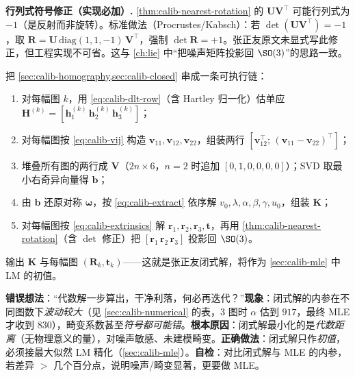 \begin{note}
\textbf{行列式符号修正（实现必加）.}\;
\cref{thm:calib-nearest-rotation} 的 $\mathbf{U}\mathbf{V}^\top$ 可能行列式为 $-1$（是反射而非旋转）。标准做法（Procrustes/Kabsch）：若 $\det(\mathbf{U}\mathbf{V}^\top)=-1$，取 $\mathbf{R}=\mathbf{U}\,\mathrm{diag}(1,1,-1)\,\mathbf{V}^\top$，强制 $\det\mathbf{R}=+1$。张正友原文未显式写此修正，但工程实现不可省。这与 \cref{ch:lie} 中“把噪声矩阵投影回 $\SO(3)$”的思路一致。
\end{note}

\begin{example}[完整闭式标定流程的代数走查]\label{ex:calib-closed-walkthrough}
把 \cref{sec:calib-homography,sec:calib-closed} 串成一条可执行链：
\begin{enumerate}
  \item 对每幅图 $k$，用 \cref{eq:calib-dlt-row}（含 Hartley 归一化）估单应 $\mathbf{H}^{(k)}=[\mathbf{h}_1^{(k)}\,\mathbf{h}_2^{(k)}\,\mathbf{h}_3^{(k)}]$；
  \item 对每幅图按 \cref{eq:calib-vij} 构造 $\mathbf{v}_{11},\mathbf{v}_{12},\mathbf{v}_{22}$，组装两行 $[\mathbf{v}_{12}^\top;\,(\mathbf{v}_{11}-\mathbf{v}_{22})^\top]$；
  \item 堆叠所有图的两行成 $\mathbf{V}$（$2n\times6$，$n=2$ 时追加 $[0,1,0,0,0,0]$）；SVD 取最小右奇异向量得 $\mathbf{b}$；
  \item 由 $\mathbf{b}$ 还原对称 $\boldsymbol{\omega}$，按 \cref{eq:calib-extract} 依序解 $v_0,\lambda,\alpha,\beta,\gamma,u_0$，组装 $\mathbf{K}$；
  \item 对每幅图按 \cref{eq:calib-extrinsics} 解 $\mathbf{r}_1,\mathbf{r}_2,\mathbf{r}_3,\mathbf{t}$，再用 \cref{thm:calib-nearest-rotation}（含 $\det$ 修正）把 $[\mathbf{r}_1\,\mathbf{r}_2\,\mathbf{r}_3]$ 投影回 $\SO(3)$。
\end{enumerate}
输出 $\mathbf{K}$ 与每幅图 $(\mathbf{R}_k,\mathbf{t}_k)$——这就是张正友闭式解，将作为 \cref{sec:calib-mle} 中 LM 的初值。
\end{example}

\begin{pitfall}
\textbf{错误想法}：“代数解一步算出，干净利落，何必再迭代？”\textbf{现象}：闭式解的内参在不同图数下\emph{波动较大}（见 \cref{sec:calib-numerical} 的表，$3$ 图时 $\alpha$ 估到 $917$，最终 MLE 才收到 $830$），畸变系数甚至\emph{符号都可能错}。\textbf{根本原因}：闭式解最小化的是\emph{代数距离}（无物理意义的量），对噪声敏感、未建模畸变。\textbf{正确做法}：闭式解只作\emph{初值}，必须接最大似然 LM 精化（\cref{sec:calib-mle}）。\textbf{自检}：对比闭式解与 MLE 的内参，若差异 $>$ 几个百分点，说明噪声/畸变显著，更要做 MLE。
\end{pitfall}

